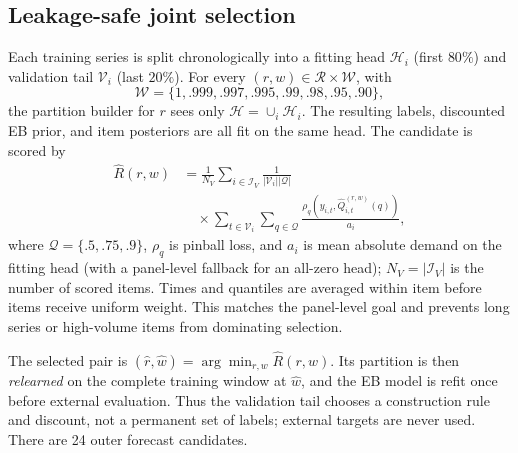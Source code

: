 \documentclass[twoside]{article}
\theoremstyle{definition}
\begin{document}
\subsection{Leakage-safe joint selection}\label{sec:select}

Each training series is split chronologically into a fitting head
$\mathcal H_i$ (first $80\%$) and validation tail $\mathcal V_i$ (last
$20\%$). For every $(r,w)\in\mathcal R\times\mathcal W$, with
\[
\mathcal W=\{1,.999,.997,.995,.99,.98,.95,.90\},
\]
the partition builder for $r$ sees only $\mathcal H=\cup_i\mathcal H_i$.
The resulting labels, discounted EB prior, and item posteriors are all
fit on the same head. The candidate is scored by
\begin{equation}
\begin{aligned}
\widehat R(r,w)
&=\frac{1}{N_{\!V}}\sum_{i\in\mathcal I_V}
  \frac{1}{|\mathcal V_i||\mathcal Q|}\\[-0.25em]
&\quad\times
  \sum_{t\in\mathcal V_i}\sum_{q\in\mathcal Q}
  \frac{\rho_q(y_{i,t},\widehat Q_{i,t}^{(r,w)}(q))}{a_i},
\end{aligned}
\label{eq:selection-risk}
\end{equation}
where $\mathcal Q=\{.5,.75,.9\}$, $\rho_q$ is pinball loss, and $a_i$
is mean absolute demand on the fitting head (with a panel-level fallback
for an all-zero head); $N_V=|\mathcal I_V|$ is the number of scored
items. Times and quantiles are averaged within item
before items receive uniform weight. This matches the panel-level goal
and prevents long series or high-volume items from dominating selection.

The selected pair is
$(\hat r,\hat w)=\arg\min_{r,w}\widehat R(r,w)$. Its partition is then
\emph{relearned} on the complete training window at $\hat w$, and the EB
model is refit once before external evaluation. Thus the validation tail
chooses a construction rule and discount, not a permanent set of labels;
external targets are never used. There are 24 outer forecast candidates.
\end{document}
